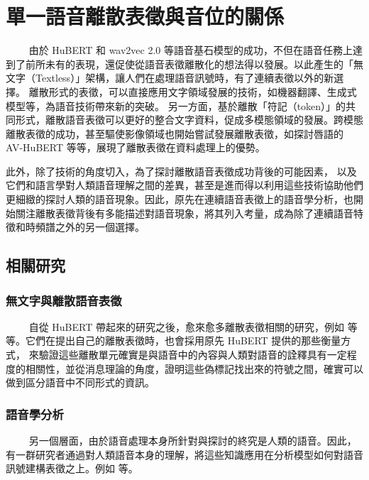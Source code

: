 
\chapter{單一語音離散表徵與音位的關係}  %
　　
由於 HuBERT 和 wav2vec 2.0 等語音基石模型的成功，不但在語音任務上達到了前所未有的表現，還促使從語音表徵離散化的想法得以發展。以此產生的「無文字（Textless）」架構，讓人們在處理語音訊號時，有了連續表徵以外的新選擇。
離散形式的表徵，可以直接應用文字領域發展的技術，如機器翻譯、生成式模型等，為語音技術帶來新的突破。
另一方面，基於離散「符記（token）」的共同形式，離散語音表徵可以更好的整合文字資料，促成多模態領域的發展。跨模態離散表徵的成功，甚至驅使影像領域也開始嘗試發展離散表徵，如探討唇語的 AV-HuBERT \cite{shi2021learning} 等等，展現了離散表徵在資料處理上的優勢。  %

此外，除了技術的角度切入，為了探討離散語音表徵成功背後的可能因素，
以及它們和語言學對人類語音理解之間的差異，甚至是進而得以利用這些技術協助他們更細緻的探討人類的語音現象。因此，原先在連續語音表徵上的語音學分析，也開始關注離散表徵背後有多能描述對語音現象，將其列入考量，成為除了連續語音特徵和時頻譜之外的另一個選擇。

\section{相關研究}

\subsection{無文字與離散語音表徵}
　　
自從 HuBERT 帶起來的研究之後，愈來愈多離散表徵相關的研究，例如  等等。它們在提出自己的離散表徵時，也會採用原先 HuBERT 提供的那些衡量方式，
來驗證這些離散單元確實是與語音中的內容與人類對語音的詮釋具有一定程度的相關性，並從消息理論的角度，證明這些偽標記找出來的符號之間，確實可以做到區分語音中不同形式的資訊。

\subsection{語音學分析}
　　
另一個層面，由於語音處理本身所針對與探討的終究是人類的語音。因此，有一群研究者通過對人類語音本身的理解，將這些知識應用在分析模型如何對語音訊號建構表徵之上。例如   等。

